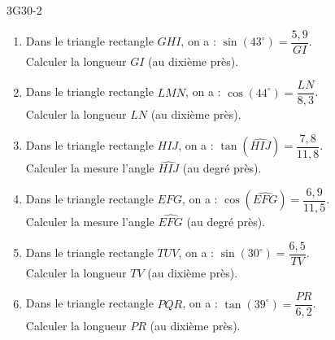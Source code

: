 \documentclass[11pt]{article}
\begin{document}
\begin{exercice}{}{3G30-2}


\begin{enumerate}[itemsep=1em]
	\item \begin{minipage}[t]{\linewidth} Dans le triangle rectangle $GHI$, on a : $\sin\left( 43 ^\circ \right) = \dfrac{5,9}{GI}$.\\Calculer la longueur $GI$ (au dixième près). \end{minipage}
	\item \begin{minipage}[t]{\linewidth} Dans le triangle rectangle $LMN$, on a : $\cos\left( 44 ^\circ \right) = \dfrac{LN}{8,3}$.\\Calculer la longueur $LN$ (au dixième près). \end{minipage}
	\item \begin{minipage}[t]{\linewidth} Dans le triangle rectangle $HIJ$, on a : $\tan\left( \widehat{HIJ} \right) = \dfrac{7,8}{11,8}$.\\Calculer la mesure l'angle $\widehat{HIJ}$ (au degré près). \end{minipage}
	\item \begin{minipage}[t]{\linewidth} Dans le triangle rectangle $EFG$, on a : $\cos\left( \widehat{EFG} \right) = \dfrac{6,9}{11,5}$.\\Calculer la mesure l'angle $\widehat{EFG}$ (au degré près). \end{minipage}
	\item \begin{minipage}[t]{\linewidth} Dans le triangle rectangle $TUV$, on a : $\sin\left( 30 ^\circ \right) = \dfrac{6,5}{TV}$.\\Calculer la longueur $TV$ (au dixième près). \end{minipage}
	\item \begin{minipage}[t]{\linewidth} Dans le triangle rectangle $PQR$, on a : $\tan\left( 39 ^\circ \right) = \dfrac{PR}{6,2}$.\\Calculer la longueur $PR$ (au dixième près). \end{minipage}
\end{enumerate}

\end{exercice}
\end{document}
